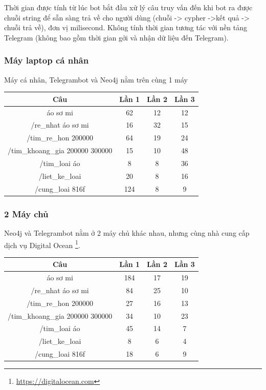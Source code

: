 Thời gian được tính từ lúc bot bắt đầu xử lý câu truy vấn đến khi bot ra được chuỗi string để sẵn sàng trả về cho người dùng (chuỗi -> cypher ->kết quả -> chuỗi trả về), đơn vị milisecond. Không tính thời gian tương tác với nền tảng Telegram (không bao gồm thời gian gởi và nhận dữ liệu đến Telegram). 

\subsubsection{Máy laptop cá nhân}
Máy cá nhân, Telegrambot và Neo4j nằm trên cùng 1 máy 

\begin{center}
 \begin{tabular}{||c c c c||} 
 \hline
Câu & Lần 1 & Lần 2 & Lần 3 \\ [0.5ex] 
 \hline
 \hline
áo sơ mi  & 62 & 12 & 12 \\ 
 \hline
/re\_nhat áo sơ mi & 16 & 32 & 15 \\
 \hline
 /tim\_re\_hon 200000 & 64 & 19 & 24 \\
 \hline
 /tim\_khoang\_gia 200000 300000 & 15 & 10 & 48 \\
 \hline
 /tim\_loai áo & 8 & 8 & 36 \\
 \hline
/liet\_ke\_loai & 20 & 8 & 16 \\
 \hline
  /cung\_loai 816f & 124 & 8  & 9 \\ [1ex] 
 \hline
\end{tabular}
\end{center}


\subsubsection{2 Máy chủ}
Neo4j và Telegrambot nằm ở 2 máy chủ khác nhau, nhưng cùng nhà cung cấp dịch vụ Digital Ocean \footnote{\url{https://digitalocean.com}}. 

\begin{center}
 \begin{tabular}{||c c c c||} 
 \hline
Câu & Lần 1 & Lần 2 & Lần 3 \\ [0.5ex] 
 \hline
 \hline
áo sơ mi  & 184 & 17 & 19 \\ 
 \hline
/re\_nhat áo sơ mi & 84 & 25 & 10 \\
 \hline
 /tim\_re\_hon 200000 & 27 & 16 & 13 \\
 \hline
 /tim\_khoang\_gia 200000 300000 & 34 & 10 & 23 \\
 \hline
 /tim\_loai áo & 45 & 14 & 7 \\
 \hline
/liet\_ke\_loai & 8  & 6 & 4 \\
 \hline
  /cung\_loai 816f & 18 & 6  & 9 \\ [1ex] 
 \hline
\end{tabular}
\end{center}


